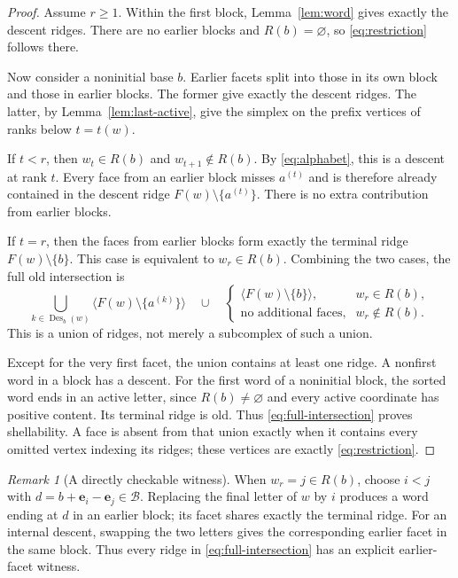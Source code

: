\documentclass[11pt]{article}
\numberwithin{equation}{section}
\theoremstyle{definition}
\theoremstyle{remark}
\newtheorem{remark}[theorem]{Remark}
\newcommand{\ee}{\mathbf e}
\newcommand{\B}{\mathcal B}
\newcommand{\pow}[1]{\langle #1\rangle}
\begin{document}
\begin{proof}
Assume $r\ge1$. Within the first block, Lemma~\ref{lem:word} gives exactly the
descent ridges. There are no earlier blocks and $R(b)=\varnothing$, so
\eqref{eq:restriction} follows there.

Now consider a noninitial base $b$. Earlier facets split into those in its
own block and those in earlier blocks. The former give exactly the descent
ridges. The latter, by Lemma~\ref{lem:last-active}, give the simplex on the
prefix vertices of ranks below $t=t(w)$.

If $t<r$, then $w_t\in R(b)$ and $w_{t+1}\notin R(b)$. By
\eqref{eq:alphabet}, this is a descent at rank $t$. Every face from an earlier
block misses $a^{(t)}$ and is therefore already contained in the descent ridge
$F(w)\setminus\{a^{(t)}\}$. There is no extra contribution from earlier blocks.

If $t=r$, then the faces from earlier blocks form exactly the terminal ridge
$F(w)\setminus\{b\}$. This case is equivalent to $w_r\in R(b)$. Combining the
two cases, the full old intersection is
\begin{equation}
 \bigcup_{k\in\operatorname{Des}_b(w)}
       \pow{F(w)\setminus\{a^{(k)}\}}
 \quad\cup\quad
 \begin{cases}
  \pow{F(w)\setminus\{b\}},&w_r\in R(b),\\
  \text{no additional faces},&w_r\notin R(b).
 \end{cases}
 \label{eq:full-intersection}
\end{equation}
This is a union of ridges, not merely a subcomplex of such a union.

Except for the very first facet, the union contains at least one ridge. A
nonfirst word in a block has a descent. For the first word of a noninitial
block, the sorted word ends in an active letter, since $R(b)\ne\varnothing$
and every active coordinate has positive content. Its terminal ridge is old.
Thus \eqref{eq:full-intersection} proves shellability. A face is absent from
that union exactly when it contains every omitted vertex indexing its ridges;
these vertices are exactly \eqref{eq:restriction}.
\end{proof}

\begin{remark}[A directly checkable witness]
When $w_r=j\in R(b)$, choose $i<j$ with $d=b+\ee_i-\ee_j\in\B$.
Replacing the final letter of $w$ by $i$ produces a word ending at $d$ in an
earlier block; its facet shares exactly the terminal ridge. For an internal
descent, swapping the two letters gives the corresponding earlier facet in
the same block. Thus every ridge in \eqref{eq:full-intersection} has an
explicit earlier-facet witness.
\end{remark}
\end{document}
